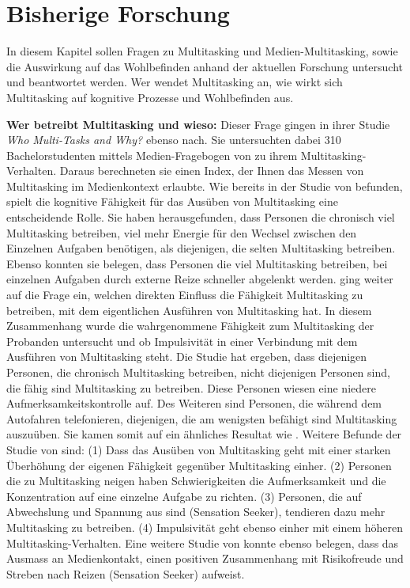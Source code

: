 \section{Bisherige Forschung}\label{section.bisherigeForschung}
In diesem Kapitel sollen Fragen zu Multitasking und Medien-Multitasking, sowie die Auswirkung auf das Wohlbefinden anhand der aktuellen Forschung untersucht und beantwortet werden. Wer wendet Multitasking an, wie wirkt sich Multitasking auf kognitive Prozesse und Wohlbefinden aus. 
\par
\textbf{Wer betreibt Multitasking und wieso:} Dieser Frage gingen  in ihrer Studie \textit{Who Multi-Tasks and Why?} ebenso nach. Sie untersuchten dabei 310 Bachelorstudenten mittels Medien-Fragebogen von  zu ihrem Multitasking-Verhalten. Daraus berechneten sie einen Index, der Ihnen das Messen von Multitasking im Medienkontext erlaubte. Wie bereits in der Studie von  befunden, spielt die kognitive Fähigkeit für das Ausüben von Multitasking eine entscheidende Rolle. Sie haben herausgefunden, dass Personen die chronisch viel Multitasking betreiben, viel mehr Energie für den Wechsel zwischen den Einzelnen Aufgaben benötigen, als diejenigen, die selten Multitasking betreiben. Ebenso konnten sie belegen, dass Personen die viel Multitasking betreiben, bei einzelnen Aufgaben durch externe Reize schneller abgelenkt werden.  ging weiter auf die Frage ein, welchen direkten Einfluss die Fähigkeit Multitasking zu betreiben, mit dem eigentlichen Ausführen von Multitasking hat. In diesem Zusammenhang wurde die wahrgenommene Fähigkeit zum Multitasking der Probanden untersucht und ob Impulsivität in einer Verbindung mit dem Ausführen von Multitasking steht. Die Studie hat ergeben, dass diejenigen Personen, die chronisch Multitasking betreiben, nicht diejenigen Personen sind, die fähig sind Multitasking zu betreiben. Diese Personen wiesen eine niedere Aufmerksamkeitskontrolle auf. Des Weiteren sind Personen, die während dem Autofahren telefonieren, diejenigen, die am wenigsten befähigt sind Multitasking auszuüben. Sie kamen somit auf ein ähnliches Resultat wie . Weitere Befunde der Studie von  sind: (1) Dass das Ausüben von Multitasking geht mit einer starken Überhöhung der eigenen Fähigkeit gegenüber Multitasking einher. (2) Personen die zu Multitasking neigen haben Schwierigkeiten die Aufmerksamkeit und die Konzentration auf eine einzelne Aufgabe zu richten. (3) Personen, die auf Abwechslung und Spannung aus sind (Sensation Seeker), tendieren dazu mehr Multitasking zu betreiben. (4) Impulsivität geht ebenso einher mit einem höheren Multitasking-Verhalten. Eine weitere Studie von  konnte ebenso belegen, dass das Ausmass an Medienkontakt, einen positiven Zusammenhang mit Risikofreude und Streben nach Reizen (Sensation Seeker) aufweist. \\
